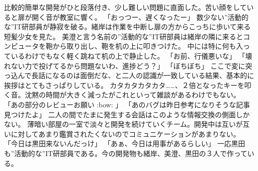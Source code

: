 \documentclass[uplatex]{utbook}
\begin{document}
比較的簡単な開発がひと段落付き、少し難しい問題に直面した。苦い顔をしていると扉が開く音が教室に響く。
「おっつー、遅くなったー」
数少ない”活動的な”IT研部員が静寂を破る。緒岸は作業を中断し扉の方からこっちに歩いて来る短髪少女を見た。
美澄と言う名前の”活動的な”IT研部員は緒岸の隣に来るとコンピュータを鞄から取り出し、鞄を机の上に叩きつけた。
中には特に何も入っているわけでもなく軽く跳ねて机の上で静止した。
「お前、行儀悪いな」
「壊れない力で投げてるから問題ないわ、進捗どう？」
「ぼちぼち」
ここで変に突っ込んで長話になるのは面倒だな、と二人の認識が一致している結果、基本的に挨拶はとてもさっぱりしている。
カタカタカタカタ……、２倍となったキーを叩く音。沈黙の時間が大きく減ったがこれといって雑談があるわけでもない。
「あの部分のレビューお願い :bow: 」
「あのバグは昨日参考になりそうな記事見つけたよ」
二人の間でたまに発生する会話はこのような情報交換の側面しかない。
薄暗い部屋の一室で淡々と開発を続けていくチーム。開発中は互いが互いに対してあまり鑑賞されたくないのでコミュニケーションがあまりない。
「今日は黒田来ないんだっけ」
「あぁ、今日は用事があるらしい」
一応黒田も”活動的な”IT研部員である。今の開発物も緒岸、美澄、黒田の３人で作っている。
\end{document}
